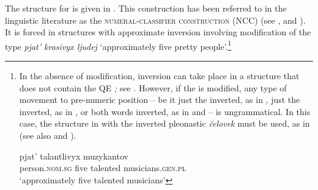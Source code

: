 \documentclass[output=paper,modfonts,newtxmath,hidelinks]{langscibook}
\begin{document}
\noindent The structure for  is given in . This construction has been referred to in the linguistic literature as the \textsc{numeral-classifier construction} (NCC) (see \citealt{Sussex1976}, \citealt{Yadroff1999} and \citealt{Pesetsky2013}). It is forced in structures with approximate inversion involving modification of the type \textit{ pjat’ krasivyx ljudej} `approximately five pretty people'.\footnote{\label{18:fn11}In the absence of modification, inversion can take place in a structure that does not contain the QE \textit{;} see . However, if the  is modified, any type of movement to pre-numeric position -- be it just the  inverted, as in , just the  inverted, as in , or both words inverted, as in  and  -- is ungrammatical. In this case, the structure in  with the inverted pleonastic  \textit{čelovek} must be used, as in  (see also \citealt{Melčuk1985} and \citealt{Yadroff1999}).%
\ea \label{18:fn11i}
	\label{18:fn11ia}
    \label{18:fn11ib}
    \z
\z

\ea \label{18:fn11ii}
    \label{18:fn11iib}
    \label{18:fn11iic}
    \label{18:fn11iid}
    \label{18:fn11iie}
    \z
\z
\ea \label{18:fn11iii}
    \gll {}    pjat’  talantlivyx  muzykantov\\
    	 person.\textsc{nom.sg}   five  talented    musicians.\textsc{gen.pl}\\
         \glt `approximately five talented musicians'
\z 
}
\end{document}
